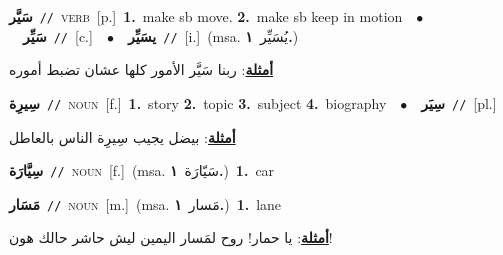 \documentclass[10pt,a4paper,twoside]{article} %
\begin{document}
\begin{multicols}{2}
{\setlength\topsep{0pt}\textbf{\foreignlanguage{arabic}{سَيَّر}}\ {\color{gray}\texttt{//}\color{black}}\ \textsc{verb}\ [p.]\ \textbf{1.}~make sb move.  \textbf{2.}~make sb keep in motion\ \ $\bullet$\ \ \setlength\topsep{0pt}\textbf{\foreignlanguage{arabic}{سَيِّر}}\ {\color{gray}\texttt{//}\color{black}}\ [c.]\ \ $\bullet$\ \ \setlength\topsep{0pt}\textbf{\foreignlanguage{arabic}{يسَيِّر}}\ {\color{gray}\texttt{//}\color{black}}\ [i.]\ \color{gray}(msa. \foreignlanguage{arabic}{يُسَيِّر}~\foreignlanguage{arabic}{\textbf{١.}})\color{black}\  \begin{flushright}\color{gray}\foreignlanguage{arabic}{\textbf{\underline{\foreignlanguage{arabic}{أمثلة}}}: ربنا سَيَّر الأمور كلها عشان تضبط أموره}\end{flushright}\color{black}} \vspace{2mm}

{\setlength\topsep{0pt}\textbf{\foreignlanguage{arabic}{سِيرِة}}\ {\color{gray}\texttt{//}\color{black}}\ \textsc{noun}\ [f.]\ \textbf{1.}~story  \textbf{2.}~topic  \textbf{3.}~subject  \textbf{4.}~biography\ \ $\bullet$\ \ \setlength\topsep{0pt}\textbf{\foreignlanguage{arabic}{سِيَر}}\ {\color{gray}\texttt{//}\color{black}}\ [pl.]\  \begin{flushright}\color{gray}\foreignlanguage{arabic}{\textbf{\underline{\foreignlanguage{arabic}{أمثلة}}}: بيضل يجيب سِيرِة الناس بالعاطل}\end{flushright}\color{black}} \vspace{2mm}

{\setlength\topsep{0pt}\textbf{\foreignlanguage{arabic}{سِيَّارَة}}\ {\color{gray}\texttt{//}\color{black}}\ \textsc{noun}\ [f.]\ \color{gray}(msa. \foreignlanguage{arabic}{سَيّارَة}~\foreignlanguage{arabic}{\textbf{١.}})\color{black}\ \textbf{1.}~car\ } \vspace{2mm}

{\setlength\topsep{0pt}\textbf{\foreignlanguage{arabic}{مَسَار}}\ {\color{gray}\texttt{//}\color{black}}\ \textsc{noun}\ [m.]\ \color{gray}(msa. \foreignlanguage{arabic}{مَسار}~\foreignlanguage{arabic}{\textbf{١.}})\color{black}\ \textbf{1.}~lane\  \begin{flushright}\color{gray}\foreignlanguage{arabic}{\textbf{\underline{\foreignlanguage{arabic}{أمثلة}}}: يا حمار! روح لمَسار اليمين ليش حاشر حالك هون!}\end{flushright}\color{black}} \vspace{2mm}


\end{multicols}
\end{document}
